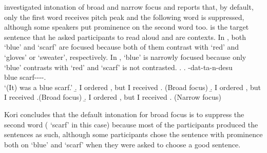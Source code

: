 %
 investigated intonation of broad and narrow focus and
reports that, by default,
only the first word receives pitch peak and the following word is
suppressed,
although some speakers put prominence on the second word too.
\Next[a] is the target sentence that he asked participants to read aloud
and \Next[b-c] are contexts.
In \Next[b-c], both  `blue' and  `scarf' are focused
because both of them contrast with `red' and `gloves' or `sweater', respectively.
In \Next[d],  `blue' is narrowly focused
because only  `blue' contrasts with `red' and
`scarf' is not contrasted.
%
\ex.
 \ag.  -dat-ta-n-desu \\
      blue scarf----. \\
      `(It) was a blue scarf.'
 \b. I ordered , but I received . \hfill{(Broad focus)}
 \b. I ordered , but I received .\hfill{(Broad focus)}
 \b. I ordered , but I received . \hfill{(Narrow focus)}

Kori concludes that
the default intonation for broad focus is to suppress the second word ( `scarf' in this case)
because most of the participants produced the sentences as such,
although some participants chose the sentence with prominence both on  `blue' and  `scarf'
when they were asked to choose a good sentence.


